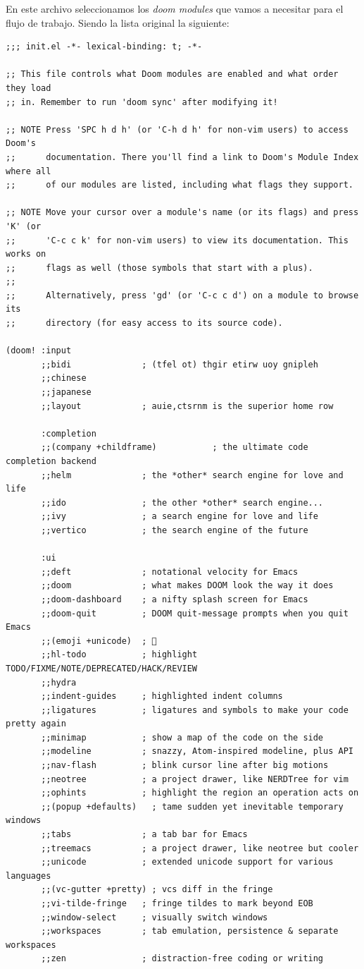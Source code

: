\documentclass[11pt]{article}
\begin{document}
En este archivo seleccionamos los \emph{doom modules} que vamos a necesitar para el flujo de trabajo. Siendo la lista original la siguiente:

\begin{verbatim}
;;; init.el -*- lexical-binding: t; -*-

;; This file controls what Doom modules are enabled and what order they load
;; in. Remember to run 'doom sync' after modifying it!

;; NOTE Press 'SPC h d h' (or 'C-h d h' for non-vim users) to access Doom's
;;      documentation. There you'll find a link to Doom's Module Index where all
;;      of our modules are listed, including what flags they support.

;; NOTE Move your cursor over a module's name (or its flags) and press 'K' (or
;;      'C-c c k' for non-vim users) to view its documentation. This works on
;;      flags as well (those symbols that start with a plus).
;;
;;      Alternatively, press 'gd' (or 'C-c c d') on a module to browse its
;;      directory (for easy access to its source code).

(doom! :input
       ;;bidi              ; (tfel ot) thgir etirw uoy gnipleh
       ;;chinese
       ;;japanese
       ;;layout            ; auie,ctsrnm is the superior home row

       :completion
       ;;(company +childframe)           ; the ultimate code completion backend
       ;;helm              ; the *other* search engine for love and life
       ;;ido               ; the other *other* search engine...
       ;;ivy               ; a search engine for love and life
       ;;vertico           ; the search engine of the future

       :ui
       ;;deft              ; notational velocity for Emacs
       ;;doom              ; what makes DOOM look the way it does
       ;;doom-dashboard    ; a nifty splash screen for Emacs
       ;;doom-quit         ; DOOM quit-message prompts when you quit Emacs
       ;;(emoji +unicode)  ; 🙂
       ;;hl-todo           ; highlight TODO/FIXME/NOTE/DEPRECATED/HACK/REVIEW
       ;;hydra
       ;;indent-guides     ; highlighted indent columns
       ;;ligatures         ; ligatures and symbols to make your code pretty again
       ;;minimap           ; show a map of the code on the side
       ;;modeline          ; snazzy, Atom-inspired modeline, plus API
       ;;nav-flash         ; blink cursor line after big motions
       ;;neotree           ; a project drawer, like NERDTree for vim
       ;;ophints           ; highlight the region an operation acts on
       ;;(popup +defaults)   ; tame sudden yet inevitable temporary windows
       ;;tabs              ; a tab bar for Emacs
       ;;treemacs          ; a project drawer, like neotree but cooler
       ;;unicode           ; extended unicode support for various languages
       ;;(vc-gutter +pretty) ; vcs diff in the fringe
       ;;vi-tilde-fringe   ; fringe tildes to mark beyond EOB
       ;;window-select     ; visually switch windows
       ;;workspaces        ; tab emulation, persistence & separate workspaces
       ;;zen               ; distraction-free coding or writing


\end{verbatim}
\end{document}
